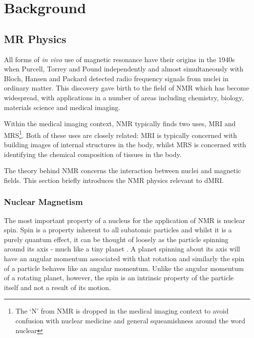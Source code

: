 \renewcommand{\BrainFuckChapter}{y}
\renewcommand{\LifeChapter}{y}
\chapter{Background}
\label{sec:background}

\section{MR Physics}
\label{sec:bg_mri_physics}
All forms of \emph{in vivo} use of magnetic resonance have their origins in the 1940s when Purcell, Torrey and Pound independently and almost simultaneously with Bloch, Hansen and Packard detected radio frequency signals from nuclei in ordinary matter\cite{Levitt2008, Barker2009,Bloch1946,Purcell1946}.
This discovery gave birth to the field of \ac{NMR} which has become widespread, with applications in a number of areas including chemistry, biology, materials science and medical imaging\cite{Barker2009, Salibi1998}.

Within the medical imaging context, \ac{NMR} typically finds two uses, \acf{MRI} and \ac{MRS}\footnote{The `N' from NMR is dropped in the medical imaging context to avoid confusion with nuclear medicine and general squeamishness around the word nuclear}.
Both of these uses are closely related: \ac{MRI} is typically concerned with building images of internal structures in the body, whilst \ac{MRS} is concerned with identifying the chemical composition of tissues in the body.

The theory behind \ac{NMR} concerns the interaction between nuclei and magnetic fields. This section briefly introduces the \ac{NMR} physics relevant to \ac{dMRI}.

\subsection{Nuclear Magnetism}
\label{sec:bg_nuclearmagnetism}

The most important property of a nucleus for the application of \ac{NMR} is nuclear spin. 
Spin is a property inherent to all subatomic particles and whilst it is a purely quantum effect, it can be thought of loosely as the particle spinning around its axis - much like a tiny planet \cite{Levitt2008}.
A planet spinning about its axis will have an angular momentum associated with that rotation and similarly the spin of a particle behaves like an angular momentum.
Unlike the angular momentum of a rotating planet, however, the spin is an intrinsic property of the particle itself and not a result of its motion\cite{Levitt2008}.

